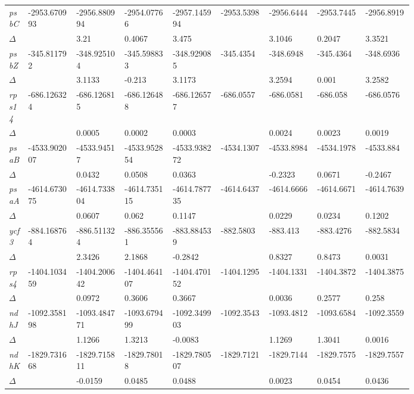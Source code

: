 \documentclass[a4paper]{article}
\begin{document}
\begin{longtable}{p{0.03\linewidth}|p{0.095\linewidth}p{0.095\linewidth}p{0.095\linewidth}p{0.095\linewidth}|p{0.095\linewidth}p{0.095\linewidth}p{0.095\linewidth}p{0.095\linewidth}}
 \rowcolor{black!20} \textit{psbC} & -2953.670993 & -2956.880994 & -2954.07766 & -2957.145994 & -2953.5398 & -2956.6444 & -2953.7445 & -2956.8919\\
 \rowcolor{black!20} $\Delta$ &  & 3.21 & 0.4067 & 3.475 &  & 3.1046 & 0.2047 & 3.3521\\
\textit{psbZ} & -345.811792 & -348.925104 & -345.598833 & -348.929085 & -345.4354 & -348.6948 & -345.4364 & -348.6936\\
$\Delta$ &  & 3.1133 & -0.213 & 3.1173 &  & 3.2594 & 0.001 & 3.2582\\
 \rowcolor{black!20} \textit{rps14} & -686.126324 & -686.126815 & -686.126488 & -686.126577 & -686.0557 & -686.0581 & -686.058 & -686.0576\\
 \rowcolor{black!20} $\Delta$ &  & 0.0005 & 0.0002 & 0.0003 &  & 0.0024 & 0.0023 & 0.0019\\
\textit{psaB} & -4533.902007 & -4533.94517 & -4533.952854 & -4533.938272 & -4534.1307 & -4533.8984 & -4534.1978 & -4533.884\\
$\Delta$ &  & 0.0432 & 0.0508 & 0.0363 &  & -0.2323 & 0.0671 & -0.2467\\
 \rowcolor{black!20} \textit{psaA} & -4614.673075 & -4614.733804 & -4614.735115 & -4614.787735 & -4614.6437 & -4614.6666 & -4614.6671 & -4614.7639\\
 \rowcolor{black!20} $\Delta$ &  & 0.0607 & 0.062 & 0.1147 &  & 0.0229 & 0.0234 & 0.1202\\
\textit{ycf3} & -884.168764 & -886.511324 & -886.355561 & -883.884539 & -882.5803 & -883.413 & -883.4276 & -882.5834\\
$\Delta$ &  & 2.3426 & 2.1868 & -0.2842 &  & 0.8327 & 0.8473 & 0.0031\\
 \rowcolor{black!20} \textit{rps4} & -1404.103459 & -1404.200642 & -1404.464107 & -1404.470152 & -1404.1295 & -1404.1331 & -1404.3872 & -1404.3875\\
 \rowcolor{black!20} $\Delta$ &  & 0.0972 & 0.3606 & 0.3667 &  & 0.0036 & 0.2577 & 0.258\\
\textit{ndhJ} & -1092.358198 & -1093.484771 & -1093.679499 & -1092.349903 & -1092.3543 & -1093.4812 & -1093.6584 & -1092.3559\\
$\Delta$ &  & 1.1266 & 1.3213 & -0.0083 &  & 1.1269 & 1.3041 & 0.0016\\
 \rowcolor{black!20} \textit{ndhK} & -1829.731668 & -1829.715811 & -1829.78018 & -1829.780507 & -1829.7121 & -1829.7144 & -1829.7575 & -1829.7557\\
 \rowcolor{black!20} $\Delta$ &  & -0.0159 & 0.0485 & 0.0488 &  & 0.0023 & 0.0454 & 0.0436\\

\end{longtable}
\end{document}
